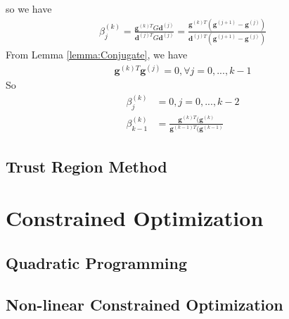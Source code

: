 \documentclass[runningheads]{llncs}
\begin{document}
    so we have
    \begin{align}
        \beta_j^{(k)} = \frac{\mathbf{g}^{(k)T} G \mathbf{d}^{(j)}}
        {\mathbf{d}^{(j)T} G \mathbf{d}^{(j)}}
        = \frac{\mathbf{g}^{(k)T} (\mathbf{g}^{(j+1)} - \mathbf{g}^{(j)})}
        {\mathbf{d}^{(j)T}(\mathbf{g}^{(j+1)} - \mathbf{g}^{(j)})}
    \end{align}
    From Lemma \ref{lemma:Conjugate}, we have 
    \begin{align}
        \mathbf{g}^{(k)T}\mathbf{g}^{(j)} = 0, \forall j = 0,..., k-1
    \end{align}
    So
    \begin{align}
        \beta_j^{(k)} &= 0, j = 0,...,k-2 \\
        \beta_{k-1}^{(k)} &= \frac{\mathbf{g}^{(k)T} (\mathbf{g}^{(k)}}{\mathbf{g}^{(k-1)T} (\mathbf{g}^{(k-1)}}
    \end{align}

\subsection{Trust Region Method}

\clearpage
\section{Constrained Optimization}
\subsection{Quadratic Programming}
\subsection{Non-linear Constrained Optimization}
\end{document}
